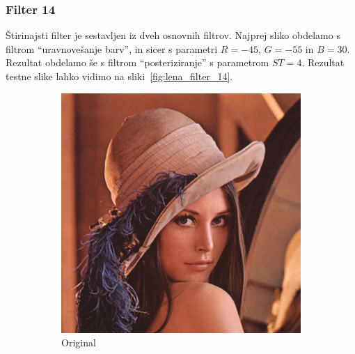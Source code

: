 \documentclass[a4paper, 12pt]{book}
\begin{document}
\subsubsection*{Filter 14}
Štirinajsti filter je sestavljen iz dveh osnovnih filtrov. Najprej sliko obdelamo s
filtrom ``uravnovešanje barv'', in sicer s parametri $R = -45$, $G = -55$ in
$B = 30$. Rezultat obdelamo še s filtrom ``posteriziranje'' s parametrom
$ST =4$. Rezultat testne slike lahko vidimo na sliki~\ref{fig:lena_filter_14}.

\begin{figure}[!ht]
    \centering
    \begin{subfigure}[b]{0.4\textwidth}
        \includegraphics[width=\textwidth]{lena}
        \caption{Original}
    \end{subfigure}
    \begin{subfigure}[b]{0.4\textwidth}

\end{subfigure}
\end{figure}
\end{document}
